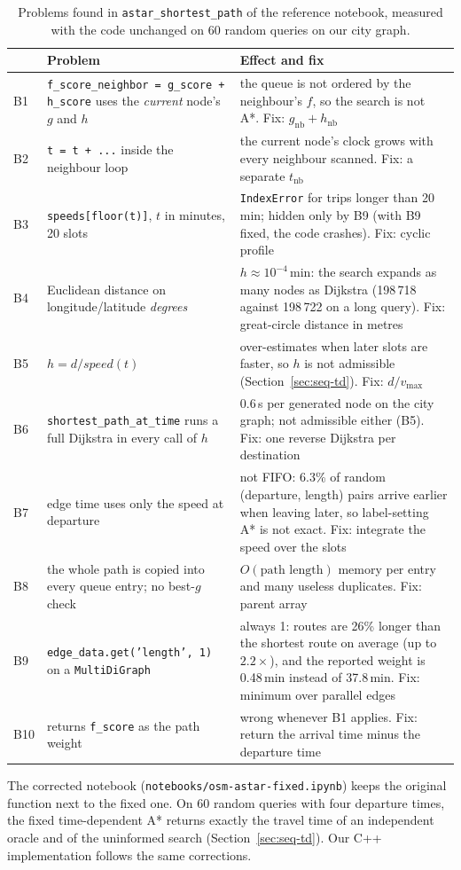 \begin{table}[H]
\centering
\small
\caption{Problems found in \texttt{astar\_shortest\_path} of the reference
notebook, measured with the code unchanged on 60 random queries on our city
graph.}
\label{tab:review}
\begin{tabularx}{\linewidth}{l >{\raggedright\arraybackslash}p{4.6cm} Y}
\toprule
 & \textbf{Problem} & \textbf{Effect and fix} \\
\midrule
B1 & \texttt{f\_score\_neighbor = g\_score + h\_score} uses the \emph{current} node's $g$ and $h$ & the queue is not ordered by the neighbour's $f$, so the search is not A*. Fix: $g_{\mathrm{nb}} + h_{\mathrm{nb}}$ \\
B2 & \texttt{t = t + ...} inside the neighbour loop & the current node's clock grows with every neighbour scanned. Fix: a separate $t_{\mathrm{nb}}$ \\
B3 & \texttt{speeds[floor(t)]}, $t$ in minutes, 20 slots & \texttt{IndexError} for trips longer than 20\,min; hidden only by B9 (with B9 fixed, the code crashes). Fix: cyclic profile \\
B4 & Euclidean distance on longitude/latitude \emph{degrees} & $h \approx 10^{-4}$\,min: the search expands as many nodes as Dijkstra (198\,718 against 198\,722 on a long query). Fix: great-circle distance in metres \\
B5 & $h = d / \textit{speed}(t)$ & over-estimates when later slots are faster, so $h$ is not admissible (Section~\ref{sec:seq-td}). Fix: $d / v_{\max}$ \\
B6 & \texttt{shortest\_path\_at\_time} runs a full Dijkstra in every call of $h$ & 0.6\,s per generated node on the city graph; not admissible either (B5). Fix: one reverse Dijkstra per destination \\
B7 & edge time uses only the speed at departure & not FIFO: 6.3\% of random (departure, length) pairs arrive earlier when leaving later, so label-setting A* is not exact. Fix: integrate the speed over the slots \\
B8 & the whole path is copied into every queue entry; no best-$g$ check & $O(\text{path length})$ memory per entry and many useless duplicates. Fix: parent array \\
B9 & \texttt{edge\_data.get('length', 1)} on a \texttt{MultiDiGraph} & always 1: routes are 26\% longer than the shortest route on average (up to $2.2\times$), and the reported weight is 0.48\,min instead of 37.8\,min. Fix: minimum over parallel edges \\
B10 & returns \texttt{f\_score} as the path weight & wrong whenever B1 applies. Fix: return the arrival time minus the departure time \\
\bottomrule
\end{tabularx}
\end{table}

The corrected notebook (\texttt{notebooks/osm-astar-fixed.ipynb}) keeps the
original function next to the fixed one. On 60 random queries with four
departure times, the fixed time-dependent A* returns exactly the travel time
of an independent oracle and of the uninformed search
(Section~\ref{sec:seq-td}). Our C++ implementation follows the same
corrections.
